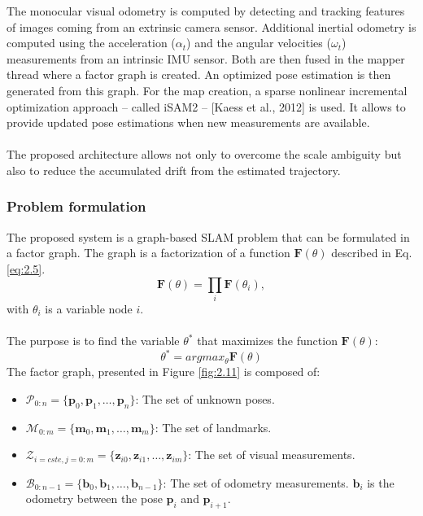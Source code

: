 The monocular visual odometry is computed by detecting and tracking features of images coming from an extrinsic camera sensor. Additional inertial odometry is computed using the acceleration ($\alpha_t$) and the angular velocities ($\omega_t$) measurements from an intrinsic IMU sensor. Both are then fused in the mapper thread where a factor graph is created. An optimized pose estimation is then generated from this graph. For the map creation, a sparse nonlinear incremental optimization approach – called iSAM2 – [Kaess et al., 2012] is used. It allows to provide updated pose estimations when new measurements are available. \\\\
The proposed architecture allows not only to overcome the scale ambiguity but also to reduce the accumulated drift from the estimated trajectory.
\subsubsection{Problem formulation}
The proposed system is a graph-based SLAM problem that can be formulated in a factor graph. The graph is a factorization of a function $\mathbf{F}(\theta)$ described in Eq.\ref{eq:2.5}.
\begin{equation} \label{eq:2.5}
    \mathbf{F}(\theta)=\prod_i\mathbf{F}(\theta_i),
\end{equation}
with $\theta_i$ is a variable node $i$.\\\\
The purpose is to find the variable $\theta^*$ that maximizes the function $\mathbf{F}(\theta)$:
\begin{equation}\label{eq:2.6}
    \theta^*=argmax_\theta\mathbf{F}(\theta)
\end{equation}
The factor graph, presented in Figure \ref{fig:2.11} is composed of:
\begin{itemize}
    \item $\mathcal{P}_{0:n}=\{\mathbf{p}_0,\mathbf{p}_1,\dots,\mathbf{p}_n\}$: The set of unknown poses.
    \item $\mathcal{M}_{0:m}=\{\mathbf{m}_0,\mathbf{m}_1,\dots,\mathbf{m}_m\}$: The set of landmarks.
    \item $\mathcal{Z}_{i=cste,j=0:m}=\{\mathbf{z}_{i0},\mathbf{z}_{i1},\dots,\mathbf{z}_{im}\}$: The set of visual measurements.
    \item $\mathcal{B}_{0:n-1}=\{\mathbf{b}_0,\mathbf{b}_1,\dots,\mathbf{b}_{n-1}\}$: The set of odometry measurements. $\mathbf{b}_i$ is the odometry between the pose $\mathbf{p}_i$ and $\mathbf{p}_{i+1}$.
\end{itemize}

